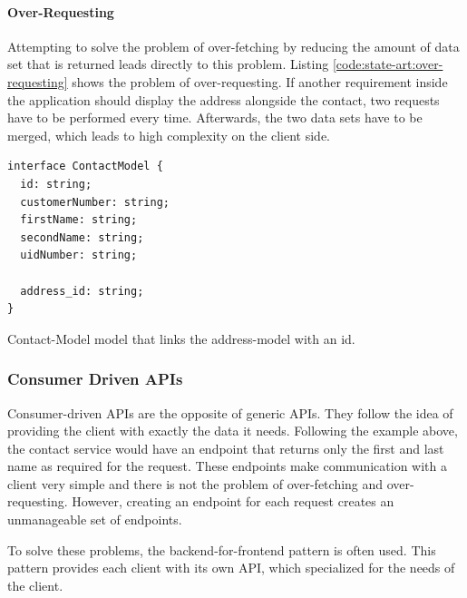 \paragraph{Over-Requesting}\label{paragraph:background:micro-frontend:generic-vs-consumer-driven-apis:generic-apis:over-requesting}

Attempting to solve the problem of over-fetching by reducing the amount of data set that is returned leads directly to this problem. Listing \ref{code:state-art:over-requesting} shows the problem of over-requesting. If another requirement inside the application should display the address alongside the contact, two requests have to be performed every time. Afterwards, the two data sets have to be merged, which leads to high complexity on the client side. \cite{misc:2019:leitner:background:micro-frontends:backend-for-frontends}

\ifshowListings
\begin{listing}[H]
    \begin{verbatim}
interface ContactModel {
  id: string;
  customerNumber: string;
  firstName: string;
  secondName: string;
  uidNumber: string;

  address_id: string;
}
    \end{verbatim}
    \caption{Contact-Model model that links the address-model with an id.}\label{code:state-art:over-requesting}
\end{listing}
\fi

\subsubsection{Consumer Driven APIs}\label{subsubection:background:micro-frontend:generic-vs-consumer-driven-apis:consumer-driven-apis}

Consumer-driven APIs are the opposite of generic APIs. They follow the idea of providing the client with exactly the data it needs. Following the example above, the contact service would have an endpoint that returns only the first and last name as required for the request. These endpoints make communication with a client very simple and there is not the problem of over-fetching and over-requesting. However, creating an endpoint for each request creates an unmanageable set of endpoints. \cite{misc:2019:leitner:background:micro-frontends:backend-for-frontends}

\bigskip

\noindent To solve these problems, the backend-for-frontend pattern is often used. This pattern provides each client with its own API, which specialized for the needs of the client. \cite{book:2018:richardson:background:bff:microservices-patterns}

